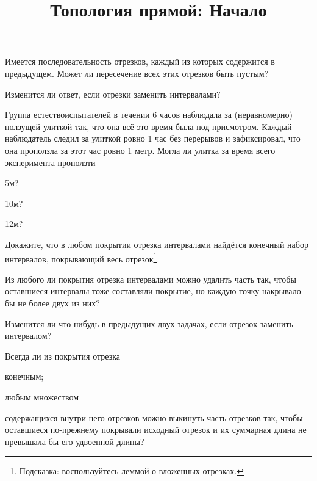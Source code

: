 \documentclass[a4paper, 12pt, num=28]{listok}
\begin{document}
\title{Топология прямой: Начало}
\maketitle{}
\begin{problem}\label{subsec}
	Имеется последовательность отрезков, каждый из которых содержится в предыдущем.
	Может ли пересечение всех этих отрезков быть пустым?
\end{problem}
\begin{problem}
	Изменится ли ответ, если отрезки заменить интервалами?
\end{problem}
\begin{problem}
	Группа естествоиспытателей в течении 6 часов наблюдала за (неравномерно) ползущей улиткой так,
	что она всё это время была под присмотром.
	Каждый наблюдатель следил за улиткой ровно 1 час без перерывов и зафиксировал, что она проползла за этот
	час ровно 1 метр. Могла ли улитка за время всего эксперимента проползти
	\begin{probparts}
		\item 5м?
		\item 10м?
		\item 12м?
	\end{probparts}
\end{problem}
\begin{problem}\label{coversec}
	Докажите, что в любом покрытии отрезка интервалами найдётся конечный набор интервалов, покрывающий весь отрезок\footnote{%
		Подсказка: воспользуйтесь леммой о вложенных отрезках.
	}.
\end{problem}
\begin{problem}
	Из любого ли покрытия отрезка интервалами можно удалить часть так, чтобы оставшиеся интервалы тоже составляли покрытие,
	но каждую точку накрывало бы не более двух из них?
\end{problem}
\begin{problem}
	Изменится ли что-нибудь в предыдущих двух задачах, если отрезок заменить интервалом?
\end{problem}
\begin{problem}
	Всегда ли из покрытия отрезка 
	\begin{probparts}
		\item конечным;
		\item любым множеством
	\end{probparts}
	содержащихся внутри него отрезков можно выкинуть часть отрезков так,
	чтобы оставшиеся по-прежнему покрывали исходный отрезок и их суммарная длина не превышала бы его удвоенной длины?
\end{problem}
\end{document}
